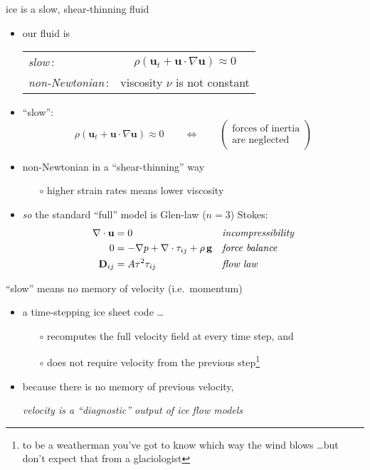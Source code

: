 \begin{frame}{ice is a slow, shear-thinning fluid}

\begin{itemize}
\item our fluid is

\smallskip
  \begin{tabular}{lc}
  \emph{slow}\,: & $\rho \left(\mathbf{u}_t + \mathbf{u}\cdot\nabla \mathbf{u}\right) \approx 0$ \\
  \emph{non-Newtonian}\,: & viscosity $\nu$ is not constant
  \end{tabular}

\bigskip
\item ``slow'':
  $$\rho \left(\mathbf{u}_t + \mathbf{u}\cdot\nabla \mathbf{u}\right) \approx 0 \qquad \iff \qquad \begin{pmatrix} \text{forces of inertia} \\ \text{are neglected} \end{pmatrix}$$

\medskip
\item non-Newtonian in a ``shear-thinning'' way
  \begin{itemize}
  \item[$\circ$] higher strain rates means lower viscosity
  \end{itemize}

\bigskip
\item \emph{so} the standard ``full'' model is Glen-law ($n=3$) \alert{Stokes}:
\begin{align*}
\nabla \cdot \mathbf{u} &= 0 &&\text{\emph{incompressibility}} \\
0 &= - \nabla p + \nabla \cdot \tau_{ij} + \rho\, \mathbf{g} &&\text{\emph{force balance}} \\
\mathbf{D}_{ij} &= A \tau^2 \tau_{ij} &&\text{\emph{flow law}}
\end{align*}

\end{itemize}
\end{frame}


\begin{frame}{``slow'' means no memory of velocity (i.e.~momentum)}

\begin{itemize}
\item a time-stepping ice sheet code \dots
  \begin{itemize}
  \item[$\circ$] recomputes the full velocity field at every time step, and
  \item[$\circ$] does not require velocity from the previous step\footnote{to be a weatherman you've got to know which way the wind blows \dots but don't expect that from a glaciologist}
  \end{itemize}

\medskip
\item because there is no memory of previous velocity,

\smallskip
\emph{velocity is a ``diagnostic'' output of ice flow models}
\end{itemize}
\end{frame}


